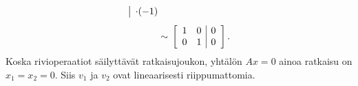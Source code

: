 \documentclass[11pt,a4paper]{amsart}
\begin{document}
\begin{solution}
\begin{enumerate}[label=(\alph*), leftmargin=*]
\[\begin{aligned}
          \quad
          \begin{array}{@{}l@{}}
            {} \\
            \smash{\rowop{\cdot(-1)}}
          \end{array}
          \\[1ex]
          &\sim{}
          \left[
            \begin{array}{rr|r}
              1 & 0 & 0 \\
              0 & 1 & 0
            \end{array}
          \right].
        \end{aligned}
      \]
      Koska rivioperaatiot säilyttävät ratkaisujoukon, yhtälön
      \(Ax=0\) ainoa ratkaisu on \(x_1=x_2=0\). Siis \(v_1\)
      ja \(v_2\) ovat lineaarisesti riippumattomia.


\end{enumerate}
\end{solution}
\end{document}
